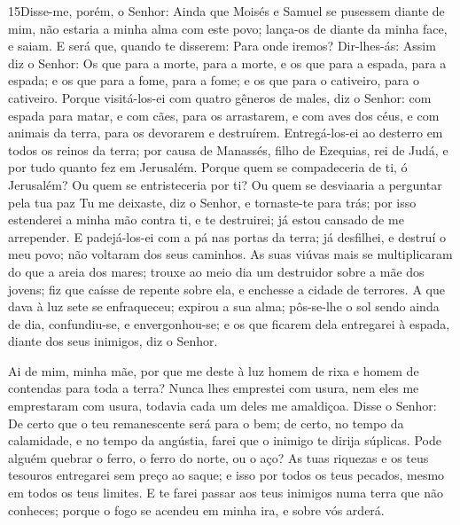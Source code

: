 \lettrine{15} Disse-me, porém, o Senhor: Ainda que Moisés e
Samuel se pusessem diante de mim, não estaria a minha alma com este
povo; lança-os de diante da minha face, e saiam. E será que,
quando te disserem: Para onde iremos? Dir-lhes-ás: Assim diz o
Senhor: Os que para a morte, para a morte, e os que para a espada,
para a espada; e os que para a fome, para a fome; e os que para o
cativeiro, para o cativeiro. Porque visitá-los-ei com quatro
gêneros de males, diz o Senhor: com espada para matar, e com cães,
para os arrastarem, e com aves dos céus, e com animais da terra,
para os devorarem e destruírem. Entregá-los-ei ao desterro em
todos os reinos da terra; por causa de Manassés, filho de Ezequias,
rei de Judá, e por tudo quanto fez em Jerusalém. Porque quem se
compadeceria de ti, ó Jerusalém? Ou quem se entristeceria por ti? Ou
quem se desviaaria a perguntar pela tua paz Tu me deixaste, diz
o Senhor, e tornaste-te para trás; por isso estenderei a minha mão
contra ti, e te destruirei; já estou cansado de me arrepender. E
padejá-los-ei com a pá nas portas da terra; já desfilhei, e destruí
o meu povo; não voltaram dos seus caminhos. As suas viúvas mais
se multiplicaram do que a areia dos mares; trouxe ao meio dia um
destruidor sobre a mãe dos jovens; fiz que caísse de repente sobre
ela, e enchesse a cidade de terrores. A que dava à luz sete se
enfraqueceu; expirou a sua alma; pôs-se-lhe o sol sendo ainda de
dia, confundiu-se, e envergonhou-se; e os que ficarem dela
entregarei à espada, diante dos seus inimigos, diz o Senhor.

Ai de mim, minha mãe, por que me deste à luz homem de rixa e
homem de contendas para toda a terra? Nunca lhes emprestei com
usura, nem eles me emprestaram com usura, todavia cada um deles me
amaldiçoa. Disse o Senhor: De certo que o teu remanescente
será para o bem; de certo, no tempo da calamidade, e no tempo da
angústia, farei que o inimigo te dirija súplicas. Pode alguém
quebrar o ferro, o ferro do norte, ou o aço? As tuas riquezas
e os teus tesouros entregarei sem preço ao saque; e isso por todos
os teus pecados, mesmo em todos os teus limites. E te farei
passar aos teus inimigos numa terra que não conheces; porque o fogo
se acendeu em minha ira, e sobre vós arderá.


